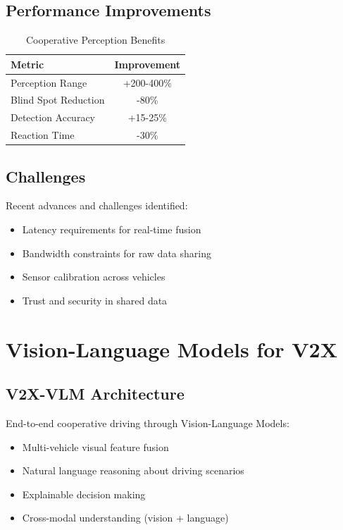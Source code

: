 \documentclass[12pt,a4paper]{article}
\begin{document}
\subsection{Performance Improvements}

\begin{table}[H]
\centering
\caption{Cooperative Perception Benefits}
\begin{tabular}{lc}
\toprule
\textbf{Metric} & \textbf{Improvement} \\
\midrule
Perception Range & +200-400\% \\
Blind Spot Reduction & -80\% \\
Detection Accuracy & +15-25\% \\
Reaction Time & -30\% \\
\bottomrule
\end{tabular}
\end{table}

\subsection{Challenges}

Recent advances and challenges identified:
\begin{itemize}
    \item Latency requirements for real-time fusion
    \item Bandwidth constraints for raw data sharing
    \item Sensor calibration across vehicles
    \item Trust and security in shared data
\end{itemize}

\section{Vision-Language Models for V2X}

\subsection{V2X-VLM Architecture}

End-to-end cooperative driving through Vision-Language Models:
\begin{itemize}
    \item Multi-vehicle visual feature fusion
    \item Natural language reasoning about driving scenarios
    \item Explainable decision making
    \item Cross-modal understanding (vision + language)
\end{itemize}
\end{document}

